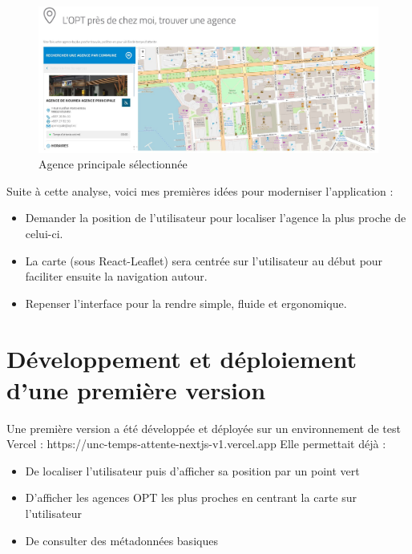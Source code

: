 \documentclass[12pt,a4paper]{report}
\begin{document}
\begin{figure}[h] %
    \centering
    \includegraphics[width=1\textwidth]{ressources_rapport/ancien_app_opt_noumea_agence_principale.JPG}
    \caption{Agence principale sélectionnée}
\end{figure}
\vspace{2cm}
Suite à cette analyse, voici mes premières idées pour moderniser l'application :
\begin{itemize}
    \item Demander la position de l'utilisateur pour localiser l'agence la plus proche de celui-ci.
    \item La carte (sous React-Leaflet) sera centrée sur l'utilisateur au début pour faciliter ensuite la navigation autour.
    \item Repenser l'interface pour la rendre simple, fluide et ergonomique.
\end{itemize}

\newpage
\section{Développement et déploiement d'une première version}
Une première version a été développée et déployée sur un environnement de test Vercel : https://unc-temps-attente-nextjs-v1.vercel.app
Elle permettait déjà :
\begin{itemize}
    \item De localiser l’utilisateur puis d'afficher sa position par un point vert
    \item D’afficher les agences OPT les plus proches en centrant la carte sur l'utilisateur
    \item De consulter des métadonnées basiques
\end{itemize}
\end{document}
